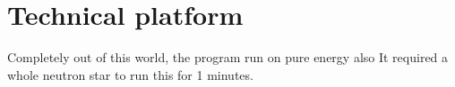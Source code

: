 \section{Technical platform}
Completely out of this world, the program run on pure energy also It required a whole neutron star to run this for 1 minutes.